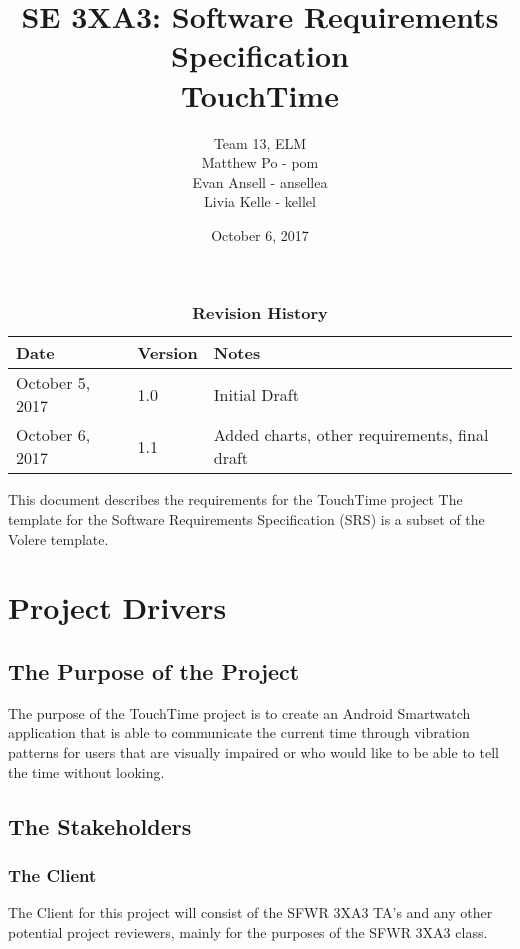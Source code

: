 \documentclass[12pt, titlepage]{article}
\title{SE 3XA3: Software Requirements Specification\\TouchTime}
\author{Team 13, ELM
		\\ Matthew Po - pom
		\\ Evan Ansell - ansellea
		\\ Livia Kelle - kellel
}
\date{October 6, 2017}
\begin{document}
\maketitle

\tableofcontents
\listoftables
\listoffigures

\begin{table}[bp]
\caption{\bf Revision History}
\begin{tabularx}{\textwidth}{p{3cm}p{2cm}X}
\toprule {\bf Date} & {\bf Version} & {\bf Notes}\\
\midrule
October 5, 2017 & 1.0 & Initial Draft\\
October 6, 2017 & 1.1 & Added charts, other requirements, final draft\\
\bottomrule
\end{tabularx}
\end{table}

\newpage


This document describes the requirements for the TouchTime project The template for the Software
Requirements Specification (SRS) is a subset of the Volere
template.  

\section{Project Drivers}

\subsection{The Purpose of the Project}
The purpose of the TouchTime project is to create an Android Smartwatch application that is able to communicate the current time through vibration patterns for users that are visually impaired or who would like to be able to tell the time without looking.

\subsection{The Stakeholders}

\subsubsection{The Client}

The Client for this project will consist of the SFWR 3XA3 TA's and any other potential project reviewers, mainly for the purposes of the SFWR 3XA3 class.  
\end{document}
